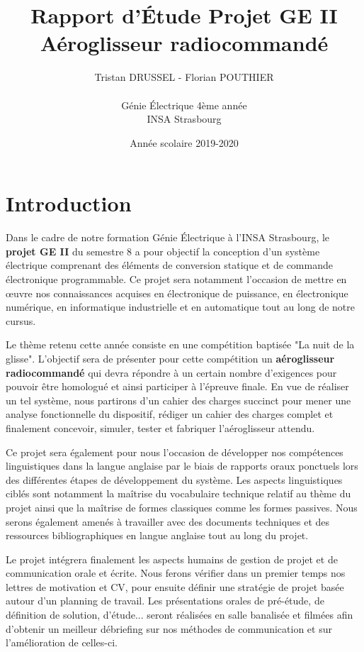 \documentclass[a4paper,12pt]{report}
\title{Rapport d'Étude Projet GE II\\Aéroglisseur radiocommandé}
\author{Tristan DRUSSEL - Florian POUTHIER \\ \\ Génie Électrique 4ème année\\ INSA Strasbourg}
\date{Année scolaire 2019-2020}
\begin{document}
	\begin{titlepage}
		\maketitle
	\end{titlepage}
	\tableofcontents
	\newpage
	
	\section{Introduction}
	
	Dans le cadre de notre formation Génie Électrique à l'INSA Strasbourg, le \textbf{projet GE II} du semestre 8 a pour objectif la conception d'un système électrique comprenant des éléments de conversion statique et de commande électronique programmable. Ce projet sera notamment l'occasion de mettre en œuvre nos connaissances acquises en électronique de puissance, en électronique numérique, en informatique industrielle et en automatique tout au long de notre cursus. 
	
	Le thème retenu cette année consiste en une compétition baptisée "La nuit de la glisse". L'objectif sera de présenter pour cette compétition un \textbf{aéroglisseur radiocommandé} qui devra répondre à un certain nombre d'exigences pour pouvoir être homologué et ainsi participer à l'épreuve finale. En vue de réaliser un tel système, nous partirons d'un cahier des charges succinct pour mener une analyse fonctionnelle du dispositif, rédiger un cahier des charges complet et finalement concevoir, simuler, tester et fabriquer l'aéroglisseur attendu.
	
	Ce projet sera également pour nous l'occasion de développer nos compétences linguistiques dans la langue anglaise par le biais de rapports oraux ponctuels lors des différentes étapes de développement du système. Les aspects linguistiques ciblés sont notamment la maîtrise du vocabulaire technique relatif au thème du projet ainsi que la maîtrise de formes classiques comme les formes passives. Nous serons également amenés à travailler avec des documents techniques et des ressources bibliographiques en langue anglaise tout au long du projet.
	
	Le projet intégrera finalement les aspects humains de gestion de projet et de communication orale et écrite. Nous ferons vérifier dans un premier temps nos lettres de motivation et CV, pour ensuite définir une stratégie de projet basée autour d'un planning de travail. Les présentations orales de pré-étude, de définition de solution, d'étude... seront réalisées en salle banalisée et filmées afin d'obtenir un meilleur débriefing sur nos méthodes de communication et sur l'amélioration de celles-ci.
	
\end{document}
